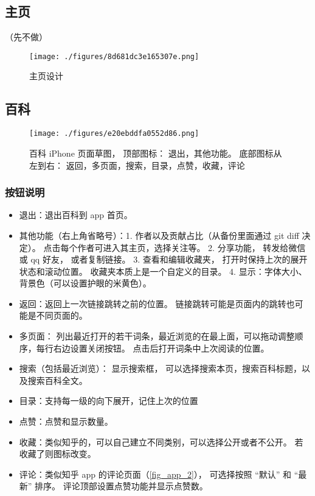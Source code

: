 
\begin{issues}
\issueDraft
\end{issues}

\subsection{主页}

（先不做）
\begin{figure}[ht]
\centering
\texttt{[image: ./figures/8d681dc3e165307e.png]}
\caption{主页设计} \label{fig_app_3}
\end{figure}

\subsection{百科}
\begin{figure}[ht]
\centering
\texttt{[image: ./figures/e20ebddfa0552d86.png]}
\caption{百科 iPhone 页面草图， 顶部图标： 退出，其他功能。 底部图标从左到右： 返回，多页面，搜索，目录，点赞，收藏，评论}\label{fig_app_1}
\end{figure}

\subsubsection{按钮说明}
\begin{itemize}
\item 退出：退出百科到 app 首页。
\item 其他功能（右上角省略号）：1. 作者以及贡献占比（从备份里面通过 git diff 决定）。 点击每个作者可进入其主页，选择关注等。 2. 分享功能， 转发给微信或 qq 好友， 或者复制链接。 3. 查看和编辑收藏夹， 打开时保持上次的展开状态和滚动位置。 收藏夹本质上是一个自定义的目录。 4. 显示：字体大小、 背景色（可以设置护眼的米黄色）。
\item 返回：返回上一次链接跳转之前的位置。 链接跳转可能是页面内的跳转也可能是不同页面的。
\item 多页面： 列出最近打开的若干词条，最近浏览的在最上面，可以拖动调整顺序，每行右边设置关闭按钮。 点击后打开词条中上次阅读的位置。
\item 搜索（包括最近浏览）： 显示搜索框， 可以选择搜索本页，搜索百科标题，以及搜索百科全文。
\item 目录：支持每一级的向下展开，记住上次的位置
\item 点赞：点赞和显示数量。
\item 收藏：类似知乎的，可以自己建立不同类别，可以选择公开或者不公开。 若收藏了则图标改变。
\item 评论：类似知乎 app 的评论页面（\autoref{fig_app_2}）， 可选择按照 “默认” 和 “最新” 排序。 评论顶部设置点赞功能并显示点赞数。
\end{itemize}

